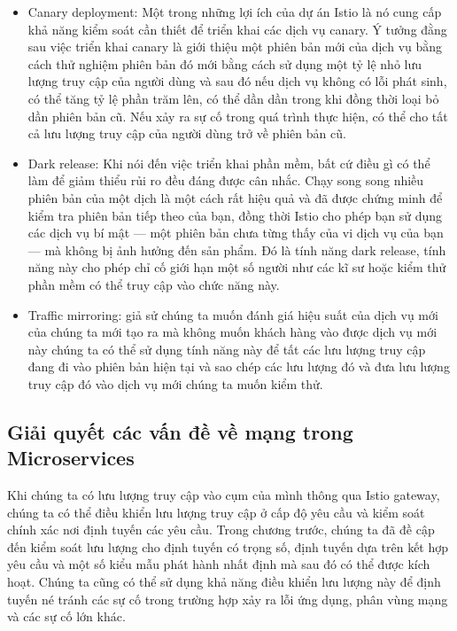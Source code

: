 \documentclass[12pt,a4paper]{report}
\begin{document}
			\begin{itemize}
				\item Canary deployment: Một trong những lợi ích của dự án Istio là nó cung cấp khả năng kiểm soát cần thiết để triển khai các dịch vụ canary. Ý tưởng đằng sau việc triển khai canary là giới thiệu một phiên bản mới của dịch vụ bằng cách thử nghiệm phiên bản đó mới bằng cách sử dụng một tỷ lệ nhỏ lưu lượng truy cập của người dùng và sau đó nếu dịch vụ không có lỗi phát sinh, có thể tăng tỷ lệ phần trăm lên, có thể dần dần trong khi đồng thời loại bỏ dần phiên bản cũ. Nếu xảy ra sự cố trong quá trình thực hiện, có thể cho tất cả lưu lượng truy cập của người dùng trở về phiên bản cũ.
				\item Dark release: Khi nói đến việc triển khai phần mềm, bất cứ điều gì có thể làm để giảm thiểu rủi ro đều đáng được cân nhắc. Chạy song song nhiều phiên bản của một dịch là một cách rất hiệu quả và đã được chứng minh để kiểm tra phiên bản tiếp theo của bạn, đồng thời Istio cho phép bạn sử dụng các dịch vụ bí mật — một phiên bản chưa từng thấy của vi dịch vụ của bạn — mà không bị ảnh hưởng đến sản phẩm. Đó là tính năng dark release, tính năng này cho phép chỉ cố giới hạn một số người như các kĩ sư hoặc kiểm thử phần mềm có thể truy cập vào chức năng này.
				\item Traffic mirroring: giả sử chúng ta muốn đánh giá hiệu suất của dịch vụ mới của chúng ta mới tạo ra mà không muốn khách hàng vào được dịch vụ mới này chúng ta có thể sử dụng tính năng này để tất các lưu lượng truy cập đang đi vào phiên bản hiện tại và sao chép các lưu lượng đó và đưa lưu lượng truy cập đó vào dịch vụ mới chúng ta muốn kiểm thử.
			\end{itemize}
			
			
		\subsection{Giải quyết các vấn đề về mạng trong Microservices}
\hspace{0.6cm}Khi chúng ta có lưu lượng truy cập vào cụm của mình thông qua Istio gateway, chúng ta có thể điều khiển lưu lượng truy cập ở cấp độ yêu cầu và kiểm soát chính xác nơi định tuyến các yêu cầu. Trong chương trước, chúng ta đã đề cập đến kiểm soát lưu lượng cho định tuyến có trọng số, định tuyến dựa trên kết hợp yêu cầu và một số kiểu mẫu phát hành nhất định mà sau đó có thể được kích hoạt. Chúng ta cũng có thể sử dụng khả năng điều khiển lưu lượng này để định tuyến né tránh các sự cố trong trường hợp xảy ra lỗi ứng dụng, phân vùng mạng và các sự cố lớn khác.
\end{document}
